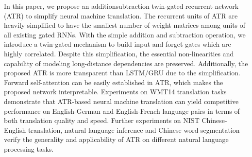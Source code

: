 In this paper, we propose an additionsubtraction twin-gated recurrent network (ATR) to simplify neural machine translation. The recurrent units of ATR are heavily simplified to have the smallest number of weight matrices among units of all existing gated RNNs. With the simple addition and subtraction operation, we introduce a twin-gated mechanism to build input and forget gates which are highly correlated. Despite this simplification, the essential non-linearities and capability of modeling long-distance dependencies are preserved. Additionally, the proposed ATR is more transparent than LSTM/GRU due to the simplification. Forward self-attention can be easily established in ATR, which makes the proposed network interpretable. Experiments on WMT14 translation tasks demonstrate that ATR-based neural machine translation can yield competitive performance on English-German and English-French language pairs in terms of both translation quality and speed. Further experiments on NIST Chinese-English translation, natural language inference and Chinese word segmentation verify the generality and applicability of ATR on different natural language processing tasks.
